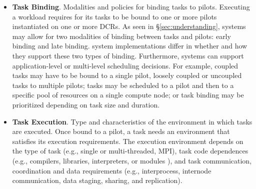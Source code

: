 \documentclass{sig-alternate}
\begin{document}
\begin{itemize}
\item \textbf{Task Binding}. Modalities and policies for binding tasks to
  pilots. Executing a workload requires for its tasks to be bound to one or more
  pilots instantiated on one or more DCRs. As seen in \S\ref{sec:understanding},
  \pilot systems may allow for two modalities of binding between tasks and
  pilots: early binding and late binding. \pilot system implementations differ
  in whether and how they support these two types of binding. Furthermore,
  \pilot systems can support application-level or multi-level scheduling
  decisions. For example, coupled tasks may have to be bound to a single pilot,
  loosely coupled or uncoupled tasks to multiple pilots; tasks may be scheduled
  to a pilot and then to a specific pool of resources on a single compute node;
  or task binding may be prioritized depending on task size and duration.

\item \textbf{Task Execution}. Type and characteristics of the environment in
  which tasks are executed. Once bound to a pilot, a task needs an environment
  that satisfies its execution requirements. The execution environment depends
  on the type of task (e.g., single or multi-threaded, MPI), task code
  dependences (e.g., compilers, libraries, interpreters, or modules ), and task
  communication, coordination and data requirements (e.g., interprocess,
  internode communication, data staging, sharing, and replication).




\end{itemize}
\end{document}
